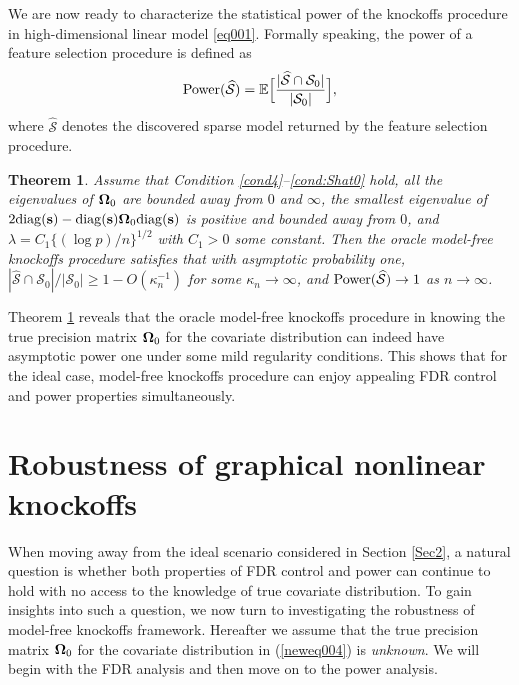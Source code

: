 \documentclass[11pt]{article}
\newtheorem{theorem}{Theorem}%
\newcommand{\bs}{\mbox{\bf s}}
\newcommand{\bOmg}{\mbox{\boldmath $\Omega$}}
\newcommand{\mb}{\mathbb}
\newcommand{\wh}{\widehat}
\newcommand{\diag}{\mathrm{diag}}
\begin{document}
We are now ready to characterize the statistical power of the knockoffs procedure in high-dimensional linear model \eqref{eq001}. Formally speaking, the power of a feature selection procedure is defined as
\begin{equation}\label{power-def1}
{\rm Power}(\wh{\mathcal{S}})=\mb{E}\Big[\dfrac{|\widehat{\mathcal S} \cap \mathcal{S}_0|}{|\mathcal{S}_0|}\Big],
\end{equation}
where $\widehat{\mathcal{S}}$ denotes the discovered sparse model returned by the feature selection procedure.

\begin{theorem}\label{theo1} Assume that Condition \ref{cond4}--\ref{cond:Shat0} hold, all the eigenvalues of $\bOmg_0$ are bounded away from $0$ and $\infty$, the smallest eigenvalue of $2\diag(\bs) - \diag(\bs)\bOmg_0\diag(\bs)$ is positive and bounded away from $0$, and $\lambda= C_1\{(\log p)/n\}^{1/2}$ with $C_1 > 0$ some constant. Then the oracle model-free knockoffs procedure satisfies that with asymptotic probability one, 	
$|\widehat{\mathcal S} \cap \mathcal{S}_0| / |\mathcal{S}_0| \geq1 - O(\kappa_n^{-1})$
for some $\kappa_n\rightarrow\infty$, and ${\rm Power}(\wh{\mathcal{S}}) \rightarrow 1$ as $n \rightarrow \infty$.
\end{theorem}

Theorem \ref{theo1} reveals that the oracle model-free knockoffs procedure in \cite{CandesFanJansonLv2016} knowing the true precision matrix $\bOmg_0$ for the covariate distribution can indeed have asymptotic power one under some mild regularity conditions. This shows that for the ideal case, model-free knockoffs procedure can enjoy appealing FDR control and power properties simultaneously.


\section{Robustness of graphical nonlinear knockoffs} \label{sec3}
When moving away from the ideal scenario considered in Section \ref{Sec2}, a natural question is whether both properties of FDR control and power can continue to hold with no access to the knowledge of true covariate distribution. To gain insights into such a question, we now turn to investigating the robustness of model-free knockoffs framework. Hereafter we assume that the true precision matrix $\bOmg_0$ for the covariate distribution in (\ref{neweq004}) is \textit{unknown}. We will begin with the FDR analysis and then move on to the power analysis.
\end{document}
